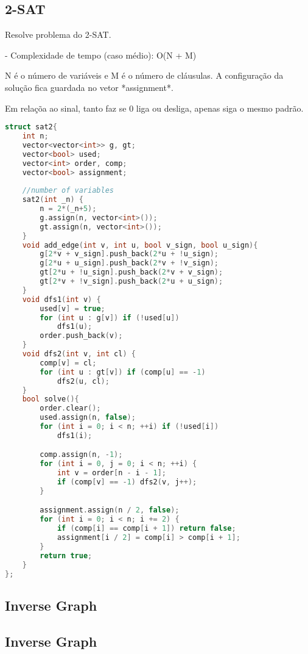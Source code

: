 \documentclass[11pt, a4paper, twoside]{article}
\begin{document}
\subsection{2-SAT  }



Resolve problema do 2-SAT.

- Complexidade de tempo (caso médio): O(N + M)  

N é o número de variáveis e M é o número de cláusulas.  
A configuração da solução fica guardada no vetor *assignment*. 

Em relaçõa ao sinal, tanto faz se 0 liga ou desliga, apenas siga o mesmo padrão.

\begin{lstlisting}[language=C++]
struct sat2{
    int n;
    vector<vector<int>> g, gt;
    vector<bool> used;
    vector<int> order, comp;
    vector<bool> assignment;
    
    //number of variables
    sat2(int _n) {
        n = 2*(_n+5); 
        g.assign(n, vector<int>());
        gt.assign(n, vector<int>());
    }  
    void add_edge(int v, int u, bool v_sign, bool u_sign){
        g[2*v + v_sign].push_back(2*u + !u_sign);
        g[2*u + u_sign].push_back(2*v + !v_sign);
        gt[2*u + !u_sign].push_back(2*v + v_sign);
        gt[2*v + !v_sign].push_back(2*u + u_sign); 
    }
    void dfs1(int v) {
        used[v] = true;
        for (int u : g[v]) if (!used[u])
            dfs1(u);
        order.push_back(v);
    }
    void dfs2(int v, int cl) {
        comp[v] = cl;
        for (int u : gt[v]) if (comp[u] == -1)
            dfs2(u, cl);
    }
    bool solve(){
        order.clear();
        used.assign(n, false);
        for (int i = 0; i < n; ++i) if (!used[i])
            dfs1(i);

        comp.assign(n, -1);
        for (int i = 0, j = 0; i < n; ++i) {
            int v = order[n - i - 1];
            if (comp[v] == -1) dfs2(v, j++);
        }

        assignment.assign(n / 2, false);
        for (int i = 0; i < n; i += 2) {
            if (comp[i] == comp[i + 1]) return false;
            assignment[i / 2] = comp[i] > comp[i + 1];
        }
        return true;
    }
};
\end{lstlisting}

\subsection{Inverse Graph}

\subsection{Inverse Graph}
\end{document}
